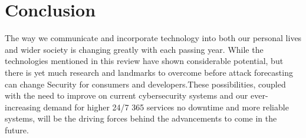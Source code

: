 \documentclass[journal]{IEEEtran}
\begin{document}
\section{Conclusion}
The way we communicate and incorporate technology into both our personal lives and wider society is changing greatly with each passing year. While the technologies mentioned in this review have shown considerable potential, but there is yet much research and landmarks to overcome before attack forecasting can change  Security  for consumers and developers.These possibilities, coupled with the need to improve on  current cybersecurity systems and our ever-increasing demand for higher 24/7 365 services no downtime and more reliable systems, will be the driving forces behind the advancements to come in the future.



\bigskip
\bigskip

\printbibliography
\end{document}
